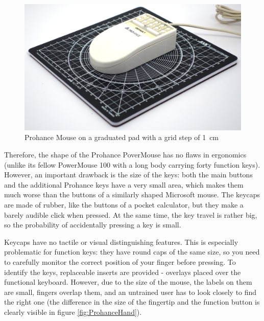 \documentclass[11pt, a4paper]{article}
\begin{document}
\begin{figure}[h]
    \centering
    \includegraphics[scale=0.35]{1989_prohance_powermouse/size_30.jpg}
    \caption{Prohance Mouse on a graduated pad with a grid step of 1~cm}
    \label{fig:ProhanceSize}
\end{figure}

Therefore, the shape of the Prohance PoverMouse has no flaws in ergonomics (unlike its fellow PowerMouse 100 with a long body carrying forty function keys). However, an important drawback is the size of the keys: both the main buttons and the additional Prohance keys have a very small area, which makes them much worse than the buttons of a similarly shaped Microsoft mouse. The keycaps are made of rubber, like the buttons of a pocket calculator, but they make a barely audible click when pressed. At the same time, the key travel is rather big, so the probability of accidentally pressing a key is small.

Keycaps have no tactile or visual distinguishing features. This is especially problematic for function keys: they have round caps of the same size, so you need to carefully monitor the correct position of your finger before pressing. To identify the keys, replaceable inserts are provided - overlays placed over the functional keyboard. However, due to the size of the mouse, the labels on them are small, fingers overlap them, and an untrained user has to look closely to find the right one (the difference in the size of the fingertip and the function button is clearly visible in figure \ref{fig:ProhanceHand}).
\end{document}
